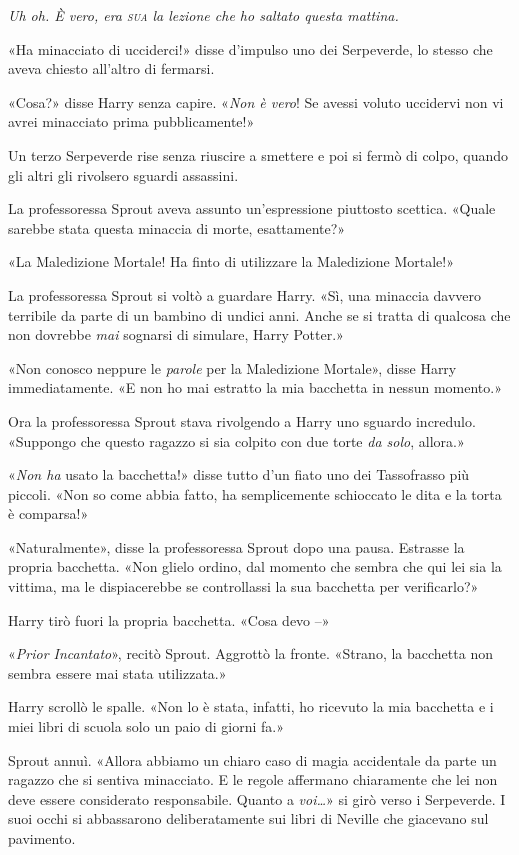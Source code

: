 \textit{Uh oh. È vero, era \textsc{sua} la lezione che ho saltato questa mattina.}

«Ha minacciato di ucciderci!» disse d’impulso uno dei Serpeverde, lo stesso che aveva chiesto all’altro di fermarsi.

«Cosa?» disse Harry senza capire. «\textit{Non è vero}! Se avessi voluto uccidervi non vi avrei minacciato prima pubblicamente!»

Un terzo Serpeverde rise senza riuscire a smettere e poi si fermò di colpo, quando gli altri gli rivolsero sguardi assassini.

La professoressa Sprout aveva assunto un’espressione piuttosto scettica. «Quale sarebbe stata questa minaccia di morte, esattamente?»

«La Maledizione Mortale! Ha finto di utilizzare la Maledizione Mortale!»

La professoressa Sprout si voltò a guardare Harry. «Sì, una minaccia davvero terribile da parte di un bambino di undici anni. Anche se si tratta di qualcosa che non dovrebbe \textit{mai} sognarsi di simulare, Harry Potter.»

«Non conosco neppure le \textit{parole} per la Maledizione Mortale», disse Harry immediatamente. «E non ho mai estratto la mia bacchetta in nessun momento.»

Ora la professoressa Sprout stava rivolgendo a Harry uno sguardo incredulo. «Suppongo che questo ragazzo si sia colpito con due torte \textit{da solo}, allora.»

«\textit{Non ha} usato la bacchetta!» disse tutto d’un fiato uno dei Tassofrasso più piccoli. «Non so come abbia fatto, ha semplicemente schioccato le dita e la torta è comparsa!»

«Naturalmente», disse la professoressa Sprout dopo una pausa. Estrasse la propria bacchetta. «Non glielo ordino, dal momento che sembra che qui lei sia la vittima, ma le dispiacerebbe se controllassi la sua bacchetta per verificarlo?»

Harry tirò fuori la propria bacchetta. «Cosa devo –»

«\textit{Prior Incantato}», recitò Sprout. Aggrottò la fronte. «Strano, la bacchetta non sembra essere mai stata utilizzata.»

Harry scrollò le spalle. «Non lo è stata, infatti, ho ricevuto la mia bacchetta e i miei libri di scuola solo un paio di giorni fa.»

Sprout annuì. «Allora abbiamo un chiaro caso di magia accidentale da parte un ragazzo che si sentiva minacciato. E le regole affermano chiaramente che lei non deve essere considerato responsabile. Quanto a \textit{voi…}» si girò verso i Serpeverde. I suoi occhi si abbassarono deliberatamente sui libri di Neville che giacevano sul pavimento.

